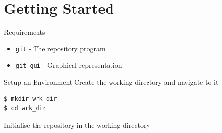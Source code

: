 \documentclass{beamer}
\begin{document}
  \section{Getting Started}
  \begin{frame}{Requirements}
    \begin{itemize}
      \item \texttt{git} - The repository program
      \item \texttt{git-gui} - Graphical representation
    \end{itemize}
  \end{frame}
  \begin{frame}[fragile=singleslide]{Setup an Environment}
    Create the working directory and navigate to it
    \begin{lstlisting}[language=bash]
$ mkdir wrk_dir
$ cd wrk_dir
    \end{lstlisting}
    Initialise the repository in the working directory
    
  \end{frame}
\end{document}
